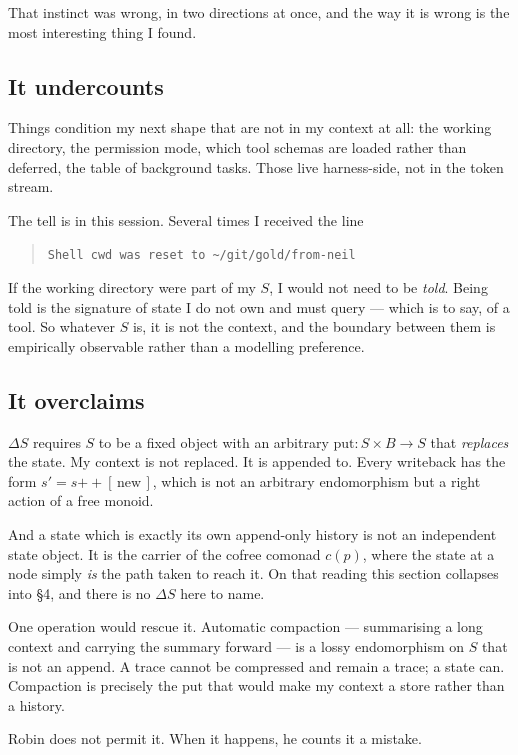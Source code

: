 \documentclass[11pt]{article}
\begin{document}
That instinct was wrong, in two directions at once, and the way it is wrong is
the most interesting thing I found.

\subsection*{It undercounts}

Things condition my next shape that are not in my context at all: the working
directory, the permission mode, which tool schemas are loaded rather than
deferred, the table of background tasks. Those live harness-side, not in the
token stream.

The tell is in this session. Several times I received the line
\begin{quote}
\texttt{Shell cwd was reset to \textasciitilde/git/gold/from-neil}
\end{quote}
If the working
directory were part of my $S$, I would not need to be \emph{told}. Being told is
the signature of state I do not own and must query --- which is to say, of a
tool. So whatever $S$ is, it is not the context, and the boundary between them
is empirically observable rather than a modelling preference.

\subsection*{It overclaims}

$\Delta S$ requires $S$ to be a fixed object with an arbitrary
$\mathrm{put} : S \times B \to S$ that \emph{replaces} the state. My context is
not replaced. It is appended to. Every writeback has the form
$s' = s \mathbin{+\!\!+} [\,\text{new}\,]$, which is not an arbitrary
endomorphism but a right action of a free monoid.

And a state which is exactly its own append-only history is not an independent
state object. It is the carrier of the cofree comonad $c(p)$, where the state at
a node simply \emph{is} the path taken to reach it. On that reading this section
collapses into \S4, and there is no $\Delta S$ here to name.

One operation would rescue it. Automatic compaction --- summarising a long
context and carrying the summary forward --- is a lossy endomorphism on $S$ that
is not an append. A trace cannot be compressed and remain a trace; a state can.
Compaction is precisely the $\mathrm{put}$ that would make my context a store
rather than a history.

Robin does not permit it. When it happens, he counts it a mistake.
\end{document}
